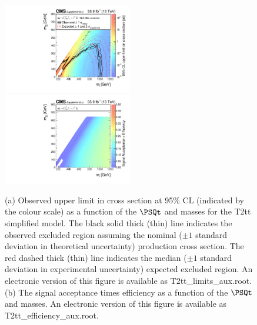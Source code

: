 \begin{figure}
    \begin{center}
            \includegraphics[width=0.50\textwidth]{Supplementary/CMS-SUS-16-038_Figure-aux_019-a}
            \includegraphics[width=0.50\textwidth]{Supplementary/CMS-SUS-16-038_Figure-aux_019-b}
        \caption{ (a) Observed upper limit in cross section at 95\% CL (indicated
        by the colour scale) as a function of 
        the $\PSQt$ and \PSGczDo %
        masses for the 
        T2tt %
        simplified  model.  The  black  solid thick  (thin)  line indicates  the
        observed  excluded  region  assuming   the  nominal  (${\pm}1$  standard
        deviation in theoretical uncertainty)  production cross section. The red
        dashed  thick  (thin)  line  indicates  the  median  (${\pm}1$  standard
        deviation in experimental uncertainty) expected excluded region.
    An electronic version of this figure is available as T2tt\_limits\_aux.root.
        (b) The signal acceptance times efficiency as a function of 
        the $\PSQt$ and \PSGczDo %
        masses.
    An electronic version of this figure is available as T2tt\_efficiency\_aux.root.
        }
        \label{fig:T2tt}
    \end{center}
\end{figure}

